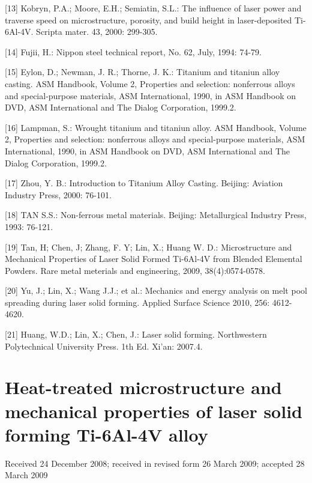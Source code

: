 \documentclass[10pt]{article}
\begin{document}
[13] Kobryn, P.A.; Moore, E.H.; Semiatin, S.L.: The influence of laser power and traverse speed on microstructure, porosity, and build height in laser-deposited Ti-6Al-4V. Scripta mater. 43, 2000: 299-305.

[14] Fujii, H.: Nippon steel technical report, No. 62, July, 1994: 74-79.

[15] Eylon, D.; Newman, J. R.; Thorne, J. K.: Titanium and titaniun alloy casting. ASM Handbook, Volume 2, Properties and selection: nonferrous alloys and special-purpose materials, ASM International, 1990, in ASM Handbook on DVD, ASM International and The Dialog Corporation, 1999.2.

[16] Lampman, S.: Wrought titanium and titaniun alloy. ASM Handbook, Volume 2, Properties and selection: nonferrous alloys and special-purpose materials, ASM International, 1990, in ASM Handbook on DVD, ASM International and The Dialog Corporation, 1999.2.

[17] Zhou, Y. B.: Introduction to Titanium Alloy Casting. Beijing: Aviation Industry Press, 2000: 76-101.

[18] TAN S.S.: Non-ferrous metal materials. Beijing: Metallurgical Industry Press, 1993: 76-121.

[19] Tan, H; Chen, J; Zhang, F. Y; Lin, X.; Huang W. D.: Microstructure and Mechanical Properties of Laser Solid Formed Ti-6Al-4V from Blended Elemental Powders. Rare metal meterials and engineering, 2009, 38(4):0574-0578.

[20] Yu, J.; Lin, X.; Wang J.J.; et al.: Mechanics and energy analysis on melt pool spreading during laser solid forming. Applied Surface Science 2010, 256: 4612-4620.

[21] Huang, W.D.; Lin, X.; Chen, J.: Laser solid forming. Northwestern Polytechnical University Press. 1th Ed. Xi'an: 2007.4.

\section*{Heat-treated microstructure and mechanical properties of laser solid forming Ti-6Al-4V alloy }
Received 24 December 2008; received in revised form 26 March 2009; accepted 28 March 2009
\end{document}
